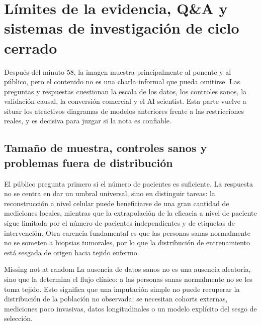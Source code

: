 \section{Límites de la evidencia, Q\&A y sistemas de investigación de ciclo cerrado}

Después del minuto 58, la imagen muestra principalmente al ponente y al público, pero el contenido no es una charla informal que pueda omitirse. Las preguntas y respuestas cuestionan la escala de los datos, los controles sanos, la validación causal, la conversión comercial y el AI scientist. Esta parte vuelve a situar los atractivos diagramas de modelos anteriores frente a las restricciones reales, y es decisiva para juzgar si la nota es confiable.

\subsection{Tamaño de muestra, controles sanos y problemas fuera de distribución}

El público pregunta primero si el número de pacientes es suficiente. La respuesta no se centra en dar un umbral universal, sino en distinguir tareas: la reconstrucción a nivel celular puede beneficiarse de una gran cantidad de mediciones locales, mientras que la extrapolación de la eficacia a nivel de paciente sigue limitada por el número de pacientes independientes y de etiquetas de intervención. Otra carencia fundamental es que las personas sanas normalmente no se someten a biopsias tumorales, por lo que la distribución de entrenamiento está sesgada de origen hacia tejido enfermo.


\begin{warningbox}{Missing not at random}
La ausencia de datos sanos no es una ausencia aleatoria, sino que la determina el flujo clínico: a las personas sanas normalmente no se les toma tejido. Esto significa que una imputación simple no puede recuperar la distribución de la población no observada; se necesitan cohorts externas, mediciones poco invasivas, datos longitudinales o un modelo explícito del sesgo de selección.
\end{warningbox}

